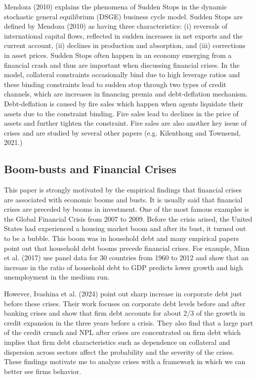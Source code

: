 \documentclass[a4paper,12pt]{article}
\begin{document}
Mendoza (2010) explains the phenomena of Sudden Stops in the dynamic stochastic general equilibrium (DSGE) business cycle model. Sudden Stops are defined by Mendoza (2010) as having three characteristics: (i) reversals of international capital flows, reflected in sudden increases in net exports and the current account, (ii) declines in production and absorption, and (iii) corrections in asset prices. Sudden Stops often happen in an economy emerging from a financial crash and thus are important when discussing financial crises. In the model, collateral constraints occasionally bind due to high leverage ratios and these binding constraints lead to sudden stop through two types of credit channels, which are increases in financing premia and debt-deflation mechanism. Debt-deflation is caused by fire sales which happen when agents liquidate their assets due to the constraint binding. Fire sales lead to declines in the price of assets and further tighten the constraint. Fire sales are also another key issue of crises and are studied by several other papers (e.g. Kilenthong and Townsend, 2021.)\par


\subsection{Boom-busts and Financial Crises}
This paper is strongly motivated by the empirical findings that financial crises are associated with economic booms and busts. It is usually said that financial crises are preceded by booms in investment. One of the most famous examples is the Global Financial Crisis from 2007 to 2009. Before the crisis arised, the United States had experienced a housing market boom and after its bust, it turned out to be a bubble. This boom was in household debt and many empirical papers point out that household debt booms precede financial crises. For example, Mian et al. (2017) use panel data for 30 countries from 1960 to 2012 and show that an increase in the ratio of household debt to GDP predicts lower growth and high unemployment in the medium run. \par
However, Ivashina et al. (2024) point out sharp increase in corporate debt just before these crises. Their work focuses on corporate debt levels before and after banking crises and show that firm debt accounts for about 2/3 of the growth in credit expansion in the three years before a crisis. They also find that a large part of the credit crunch and NPL after crises are concentrated on firm debt which implies that firm debt characteristics such as dependence on collateral and dispersion across sectors affect the probability and the severity of the crises. These findings motivate me to analyze crises with a framework in which we can better see firms behavior.\par
\end{document}
